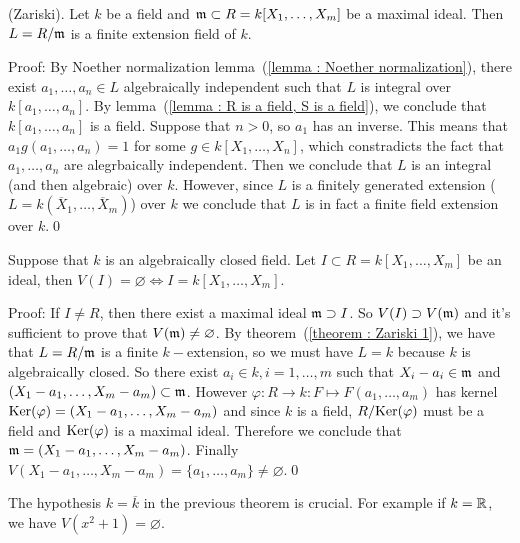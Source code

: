 \begin{dang}
    \begin{theorem}\label{theorem : Zariski 1}
        (Zariski). Let $k$ be a field and $\mathfrak{m}\subset R=k[X_1,\dots, X_m]$ be a maximal ideal. Then $L=R/\mathfrak{m}$ is 
        a finite extension field of $k$.
    \end{theorem}
\end{dang}
Proof: By Noether normalization lemma~(\ref{lemma : Noether normalization}), there exist 
$a_1,\dots, a_n\in L$ algebraically independent such that $L$ is integral over $k[a_1,\dots,a_n]$. By lemma~(\ref{lemma : R is a field, S is a field}), 
we conclude that $k[a_1,\dots,a_n]$ is a field. Suppose that $n>0$, so $a_1$ has an inverse. This means that 
$a_1g(a_1,\dots, a_n) = 1$ for some $g\in k[X_1,\dots, X_n]$, which constradicts the fact that $a_1,\dots, a_n$ are 
alegrbaically independent. Then we conclude that $L$ is an integral (and then algebraic) over $k$. However, since 
$L$ is a finitely generated extension ($L=k(\overline{X}_1,\dots,\overline{X}_m)$) over $k$ we conclude that $L$ is in fact 
a finite field extension over $k$.\qed

\begin{dang}
    \begin{theorem}\label{theorem : Hilbert's zero theorem}
        Suppose that $k$ is an algebraically closed field.
        Let $I\subset R =k[X_1,\dots, X_m]$ be an ideal, then $V(I)=\varnothing\iff I = k[X_1,\dots, X_m]$.
    \end{theorem}
\end{dang}
Proof: If $I\neq R$, then there exist a maximal ideal $\mathfrak{m}\supset I$. So $V(I)\supset V(\mathfrak{m})$ and it's sufficient to 
prove that $V(\mathfrak{m})\neq\varnothing$. By theorem~(\ref{theorem : Zariski 1}), we have that $L=R/\mathfrak{m}$ is a finite 
$k-$extension, so we must have $L=k$ because $k$ is algebraically closed. So there exist $a_i\in k,i=1,\dots,m$ such that 
$X_i - a_i\in\mathfrak{m}$ and $(X_1-a_1,\dots, X_m-a_m)\subset \mathfrak{m}$. However $\varphi: R\to k:F\mapsto F(a_1,\dots,a_m)$ has kernel 
$\text{Ker}(\varphi)=(X_1-a_1,\dots, X_m-a_m)$ and since $k$ is a field, $R/\text{Ker}(\varphi)$ must be  a field and 
$\text{Ker}(\varphi)$ is a maximal ideal. Therefore we conclude that $\mathfrak{m}=(X_1-a_1,\dots, X_m-a_m)$. Finally
$V(X_1-a_1,\dots,X_m-a_m)=\{a_1,\dots,a_m\}\neq\varnothing$.\qed

\begin{remark}
    The hypothesis $k=\overline{k}$ in the previous theorem is crucial. For example if $k=\mathbb{R}$, we have 
    $V(x^2+1)=\varnothing$.
\end{remark}

